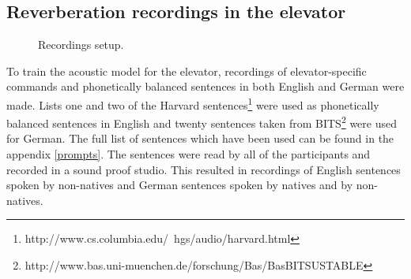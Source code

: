 \documentclass[a4paper, 12pt]{article}
\begin{document}
\subsection{Reverberation recordings in the elevator}

\begin{figure}
\caption{Recordings setup.}
\label{fig:recordingsetup}
\end{figure}


To train the acoustic model for the elevator, recordings of elevator-specific commands and phonetically balanced sentences in both English and German were made. 
Lists one and two  of the Harvard sentences\footnote{http://www.cs.columbia.edu/~hgs/audio/harvard.html} were used as phonetically balanced sentences in English and twenty sentences taken from BITS\footnote{http://www.bas.uni-muenchen.de/forschung/Bas/BasBITSUSTABLE} were used for German. 
The full list of sentences which have been used can be found in the appendix \ref{prompts}.
The sentences were read by all of the participants and recorded in a sound proof studio. 
This resulted in recordings of English sentences spoken by non-natives and German sentences spoken by natives and by non-natives.
\end{document}
